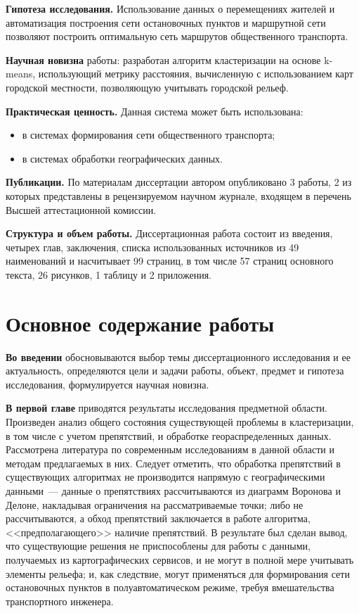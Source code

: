 \textbf{Гипотеза исследования.} Использование данных о перемещениях жителей и автоматизация построения сети остановочных пунктов и маршрутной сети позволяют построить оптимальную сеть маршрутов общественного транспорта.

\textbf{Научная новизна} работы: разработан алгоритм кластеризации на основе
k-means, использующий метрику расстояния, вычисленную с использованием
карт городской местности, позволяющую учитывать городской рельеф.

\textbf{Практическая ценность.} Данная система может быть использована:
\begin{itemize}
    \item в системах формирования сети общественного транспорта;
    \item в системах обработки географических данных.
\end{itemize}

\textbf{Публикации.} По материалам диссертации автором опубликовано 3 работы, 2 из которых представлены в рецензируемом научном журнале, входящем в перечень Высшей аттестационной комиссии. 

\textbf{Структура и объем работы.} Диссертационная работа состоит из введения, четырех глав, заключения, списка использованных источников из 49 наименований и насчитывает 99 страниц, в том числе 57 страниц основного текста, 26 рисунков, 1 таблицу и 2 приложения.

\section{Основное содержание работы}
\textbf{Во введении} обосновываются выбор темы диссертационного исследования и ее актуальность, определяются 
цели и задачи работы, объект, предмет и гипотеза исследования, формулируется научная новизна.

\textbf{В первой главе} приводятся результаты исследования предметной области. Произведен анализ общего состояния существующей проблемы в кластеризации, в том числе с учетом препятствий, и обработке геораспределенных данных. Рассмотрена литература по современным исследованиям в данной области и методам предлагаемых в них. Следует отметить, что обработка препятствий в существующих алгоритмах не производится напрямую с географическими данными~--- данные о препятствиях рассчитываются из диаграмм Воронова и Делоне, накладывая ограничения на рассматриваемые точки; либо не рассчитываются, а обход препятствий заключается в работе алгоритма, <<предполагающего>> наличие препятствий. В результате был сделан вывод, что существующие решения не приспособлены для работы с данными, получаемых из картографических сервисов, и не могут в полной мере учитывать элементы рельефа; и, как следствие, могут применяться для формирования сети остановочных пунктов в полуавтоматическом режиме, требуя вмешательства транспортного инженера.

